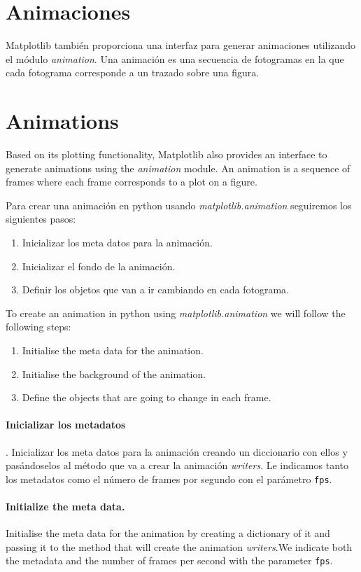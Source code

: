 \begin{paracol}{2}
\section{Animaciones}
Matplotlib también proporciona una interfaz para generar animaciones utilizando el módulo \textit{animation}. Una animación es una secuencia de fotogramas en la que cada fotograma corresponde a un trazado sobre una figura.

    \switchcolumn
    \section{Animations}
    Based on its plotting functionality, Matplotlib also provides an interface to generate animations using the \textit{animation} module. An animation is a sequence of frames where each frame corresponds to a plot on a figure.

    \switchcolumn
    Para crear una animación en python usando \textit{matplotlib.animation} seguiremos los siguientes pasos:
    \begin{enumerate}
        \item Inicializar los meta datos para la animación.
        \item Inicializar el fondo de la animación.
        \item Definir los objetos que van a ir cambiando en cada fotograma.   
    \end{enumerate}

    \switchcolumn

      To create an animation in python using \textit{matplotlib.animation} we will follow the following steps:
    \begin{enumerate}
        \item Initialise the meta data for the animation.
         \item Initialise the background of the animation.
        \item Define the objects that are going to change in each frame. 
    \end{enumerate}

\switchcolumn
\paragraph{Inicializar los metadatos}. Inicializar los meta datos para la animación creando un diccionario con ellos y pasándoselos al método que va a crear la animación \textit{writers}. Le indicamos tanto los metadatos como el número de frames por segundo con el parámetro \texttt{fps}.
\switchcolumn
\paragraph{Initialize the meta data.} Initialise the meta data for the animation by creating a dictionary of it and passing it to the method that will create the animation \textit{writers}.We indicate both the metadata and the number of frames per second with the parameter \texttt{fps}.
\end{paracol}

